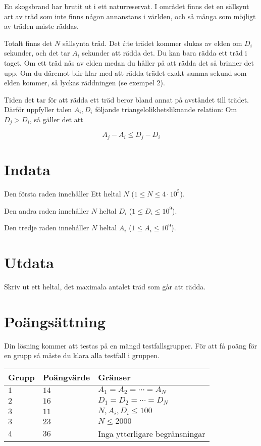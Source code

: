 
En skogsbrand har brutit ut i ett naturreservat. I området finns det en sällsynt art av träd
som inte finns någon annanstans i världen, och så många som möjligt av träden måste räddas.

Totalt finns det $N$ sällsynta träd. Det $i$:te trädet kommer slukas av elden om $D_i$ sekunder,
och det tar $A_i$ sekunder att rädda det. Du kan bara rädda ett träd i taget. Om ett träd nås
av elden medan du håller på att rädda det så brinner det upp. Om du däremot blir klar med att rädda
trädet exakt samma sekund som elden kommer, så lyckas räddningen (se exempel $2$).

Tiden det tar för att rädda ett träd beror bland annat på avståndet till trädet. Därför uppfyller
talen $A_i, D_i$ följande triangelolikhetsliknande relation: Om $D_j > D_i$, så gäller det att 

$$A_j - A_i \leq D_j - D_i$$

\section*{Indata}

Den första raden innehåller Ett heltal $N$ ($1 \leq N \leq 4 \cdot 10^5$).

Den andra raden innehåller $N$ heltal $D_i$ ($1 \leq D_i \leq 10^9$).

Den tredje raden innehåller $N$ heltal $A_i$ ($1 \leq A_i \leq 10^9$).

\section*{Utdata}
Skriv ut ett heltal, det maximala antalet träd som går att rädda.

\section*{Poängsättning}
Din lösning kommer att testas på en mängd testfallsgrupper.
För att få poäng för en grupp så måste du klara alla testfall i gruppen.

\noindent
\begin{tabular}{| l | l | p{12cm} |}
  \hline
  Grupp & Poängvärde & Gränser \\ \hline
  $1$   & $14$       & $A_1 = A_2 = \cdots = A_N$\\ \hline
  $2$   & $16$       & $D_1 = D_2 = \cdots = D_N$  \\ \hline
  $3$   & $11$       & $N, A_i, D_i \leq 100$ \\ \hline
  $3$   & $23$       & $N \leq 2000$ \\ \hline
  $4$   & $36$       & Inga ytterligare begränsningar \\ \hline
\end{tabular}